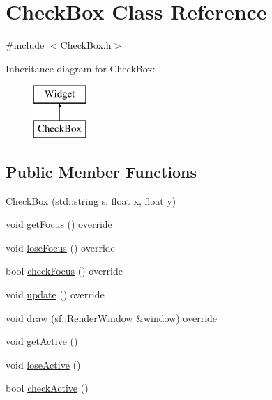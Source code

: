 \hypertarget{class_check_box}{}\section{Check\+Box Class Reference}
\label{class_check_box}


{\ttfamily \#include $<$Check\+Box.\+h$>$}

Inheritance diagram for Check\+Box\+:\begin{figure}[H]
\begin{center}
\leavevmode
\includegraphics[height=2.000000cm]{class_check_box}
\end{center}
\end{figure}
\subsection*{Public Member Functions}
\begin{DoxyCompactItemize}
\item 
\mbox{\hyperlink{class_check_box_a856f71f19447ffca4133c6ea05d605c9}{Check\+Box}} (std\+::string s, float x, float y)
\item 
void \mbox{\hyperlink{class_check_box_a86a6399e17216849708c07ed51df3510}{get\+Focus}} () override
\item 
void \mbox{\hyperlink{class_check_box_a071873f266cc4b88eb077bc7d0ec7524}{lose\+Focus}} () override
\item 
bool \mbox{\hyperlink{class_check_box_acc7a00bdaa6ee316e7622a52733be294}{check\+Focus}} () override
\item 
void \mbox{\hyperlink{class_check_box_a02e3ede9dd393fd232f1655205a3c51a}{update}} () override
\item 
void \mbox{\hyperlink{class_check_box_ade6c518dbbed2d24f101af024b08495f}{draw}} (sf\+::\+Render\+Window \&window) override
\item 
void \mbox{\hyperlink{class_check_box_a40948ae138e422b4b025c225e1c532b5}{get\+Active}} ()
\item 
void \mbox{\hyperlink{class_check_box_aa4eb44d9c99f24b566233ec7d0504808}{lose\+Active}} ()
\item 
bool \mbox{\hyperlink{class_check_box_a7c03915fe705fd35e2d1934c00d2c3e8}{check\+Active}} ()
\end{DoxyCompactItemize}
